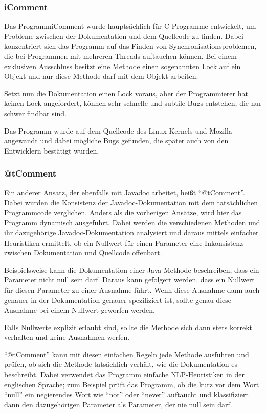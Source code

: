 \subsubsection{iComment}
Das Programm\textit{}{\/\*iComment}  wurde hauptsächlich für C-Programme entwickelt, um Probleme zwischen der Dokumentation und dem Quellcode zu finden. Dabei konzentriert sich das Programm auf das Finden von Synchronisationsproblemen, die bei Programmen mit mehreren Threads auftauchen können.  Bei einem exklusiven Ausschluss besitzt eine Methode einen sogenannten Lock auf ein Objekt und nur diese Methode darf mit dem Objekt arbeiten.

Setzt nun die Dokumentation einen Lock voraus, aber der Programmierer hat keinen Lock angefordert, können sehr schnelle und subtile Bugs entstehen, die nur schwer findbar sind. \cite[S. 145ff.]{icomment}

Das Programm wurde auf dem Quellcode des Linux-Kernels und Mozilla angewandt und dabei mögliche Bugs gefunden, die später auch von den Entwicklern bestätigt wurden\cite[S. 146.]{icomment}.
\subsubsection{@tComment}
Ein anderer Ansatz, der ebenfalls mit Javadoc arbeitet, heißt \enquote{@tComment}\cite[S. 1ff.]{@tComment:TestingJavadocCommentstoDetectComment-CodeInconsistencies}. Dabei wurden die Konsistenz der Javadoc-Dokumentation mit dem tatsächlichen Programmcode verglichen. Anders als die vorherigen Ansätze, wird hier das Programm dynamisch ausgeführt. Dabei werden die verschiedenen Methoden und ihr dazugehörige Javadoc-Dokumentation analysiert und daraus mittels einfacher Heuristiken ermittelt, ob ein  Nullwert für einen Parameter eine Inkonsistenz zwischen Dokumentation und Quellcode offenbart.

Beispielsweise kann die Dokumentation einer Java-Methode beschreiben, dass ein Parameter nicht null sein darf. Daraus kann gefolgert werden, dass ein Nullwert für diesen Parameter zu einer Ausnahme führt. Wenn diese Ausnahme dann auch genauer in der Dokumentation genauer spezifiziert ist, sollte genau diese Ausnahme bei einem Nullwert geworfen werden. 

Falls Nullwerte explizit erlaubt sind, sollte die Methode sich dann stets korrekt verhalten und keine Ausnahmen werfen. 

\enquote{@tComment} kann mit diesen einfachen Regeln jede Methode ausführen und prüfen, ob sich die Methode tatsächlich verhält, wie die Dokumentation es beschreibt. Dabei verwendet das Programm einfache \ac{NLP}-Heuristiken in der englischen Sprache; zum Beispiel prüft das Programm, ob die kurz vor dem Wort \enquote{null} ein negierendes Wort wie \enquote{not} oder \enquote{never} auftaucht und klassifiziert dann den dazugehörigen Parameter als Parameter, der nie null sein darf. 
